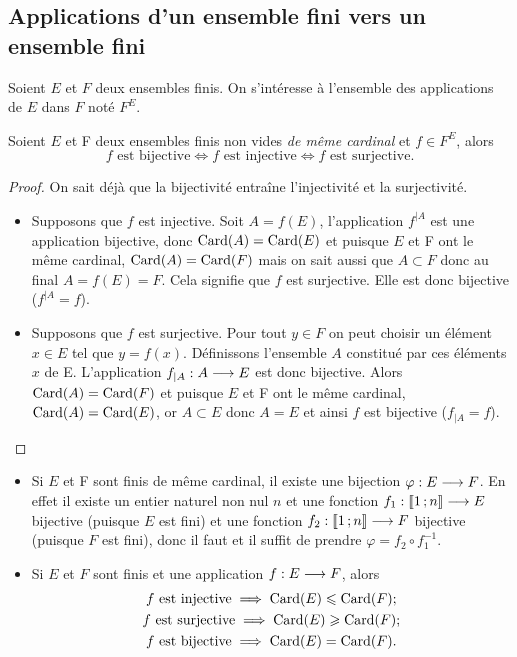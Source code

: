 \subsection{Applications d'un ensemble fini vers un ensemble fini}

Soient \(E\) et \(F\) deux ensembles finis. On s'intéresse à l'ensemble des 
applications de \(E\) dans \(F\) noté \(F^E\).

\begin{theo}\label{theo:bijinjsurj}
  Soient \(E\) et F deux ensembles finis non vides \emph{de même cardinal} et 
  \(f\in F^E\), alors
  \begin{equation}
    f \text{~est bijective}\iff f \text{~est injective}\iff f \text{~est 
    surjective}.
  \end{equation}
\end{theo}

\begin{proof}
  On sait déjà que la bijectivité entraîne l'injectivité et la surjectivité.
  \begin{itemize}
    \item Supposons que \(f\) est injective. Soit \(A = f(E)\), l'application 
      \(f^{|A}\) est une application bijective, donc \(\operatorname{Card}(A)=\operatorname{Card}(E)\) et 
      puisque \(E\) et F ont le même cardinal, \(\operatorname{Card}(A)=\operatorname{Card}(F)\) mais on 
      sait aussi que \(A\subset F\) donc au final \(A = f(E)=F\). Cela signifie 
      que \(f\) est surjective. Elle est donc bijective (\(f^{|A}=f\)).
    \item Supposons que \(f\) est surjective. Pour tout \(y\in F\) on peut 
      choisir un élément \(x\in E\) tel que \(y = f(x)\). Définissons l'ensemble 
      \(A\) constitué par ces éléments \(x\) de E. L'application 
      \(f_{|A}:A \longrightarrow E\) est donc bijective. Alors \(\operatorname{Card}(A)=\operatorname{Card}(F)\) 
      et puisque \(E\) et F ont le même cardinal, \(\operatorname{Card}(A)=\operatorname{Card}(E)\), or 
      \(A\subset E\) donc \(A = E\) et ainsi \(f\) est bijective (\(f_{|A}=f\)).
  \end{itemize}
\end{proof}
\begin{itemize}
  \item Si \(E\) et F sont finis de même cardinal, il existe une bijection 
    \(\varphi:E \longrightarrow F\). En effet il existe un entier naturel non nul 
    \(n\) et une fonction \(f_1:\mathopen{\llbracket}1\mathclose{}\mathpunct{};n\mathclose{\rrbracket} \longrightarrow E\) 
    bijective (puisque \(E\) est fini) et une fonction 
    \(f_2:\mathopen{\llbracket}1\mathclose{}\mathpunct{};n\mathclose{\rrbracket} \longrightarrow F\) bijective (puisque \(F\) est 
    fini), donc il faut et il suffit de prendre \(\varphi = f_2\circ f_1^{-1}\).
  \item Si \(E\) et \(F\) sont finis et une application \(f:E \longrightarrow F\), 
    alors
    \begin{gather}
      f \text{~est injective} \implies \operatorname{Card}(E)\leqslant\operatorname{Card}(F); \\
      f \text{~est surjective}\implies \operatorname{Card}(E)\geqslant\operatorname{Card}(F);\\
    f \text{~est bijective} \implies \operatorname{Card}(E)=\operatorname{Card}(F).  \end{gather}
\end{itemize}

